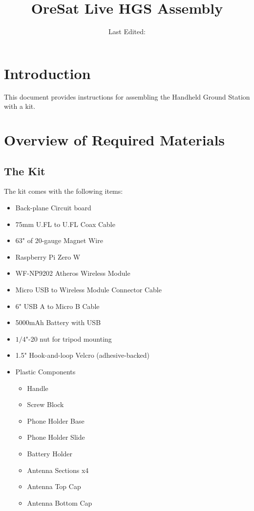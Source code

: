 \documentclass[paper=a4,parskip=full+]{scrartcl}
\title{OreSat Live HGS Assembly}
\date{Last Edited: \lastedit}
\begin{document}
\maketitle
\tableofcontents

\section{Introduction}
This document provides instructions for assembling the Handheld Ground Station with a kit.
\section{Overview of Required Materials}
\subsection{The Kit}
The kit comes with the following items:
\begin{itemize}
    \item Back-plane Circuit board
    \item 75mm U.FL to U.FL Coax Cable
    \item 63" of 20-gauge Magnet Wire
    \item Raspberry Pi Zero W
    \item WF-NP9202 Atheros Wireless Module
    \item Micro USB to Wireless Module Connector Cable
    \item 6" USB A to Micro B Cable
    \item 5000mAh Battery with USB
    \item $1/4$"-20 nut for tripod mounting
    \item 1.5" Hook-and-loop Velcro (adhesive-backed)
    \item Plastic Components
    \begin{itemize}
        \item Handle
        \item Screw Block
        \item Phone Holder Base
        \item Phone Holder Slide
        \item Battery Holder
        \item Antenna Sections x4
        \item Antenna Top Cap
        \item Antenna Bottom Cap
    \end{itemize}
\end{itemize}
\end{document}
